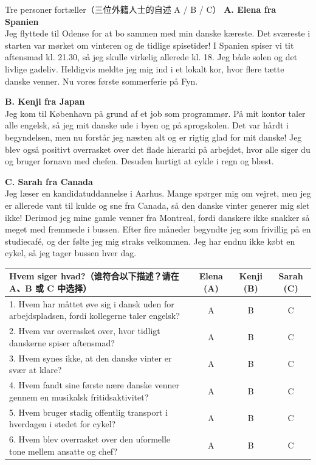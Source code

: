 \vspace{0.3em}
\begin{emailbox}{Tre personer fortæller（三位外籍人士的自述 A / B / C）}
\textbf{A. Elena fra Spanien}\\
Jeg flyttede til Odense for at bo sammen med min danske kæreste. Det sværeste i starten var mørket om vinteren og de tidlige spisetider! I Spanien spiser vi tit aftensmad kl. 21.30, så jeg skulle virkelig  allerede kl. 18. Jeg  både solen og det livlige gadeliv. Heldigvis meldte jeg mig ind i et lokalt kor, hvor  flere tætte danske venner. Nu  vores første sommerferie på Fyn.

\vspace{0.35em}
\textbf{B. Kenji fra Japan}\\
Jeg kom til København på grund af et job som programmør. På mit kontor taler alle engelsk, så jeg  mit danske ude i byen og på sprogskolen. Det var hårdt i begyndelsen, men nu forstår jeg næsten alt og er rigtig glad for mit danske! Jeg blev også positivt overrasket over det flade hierarki på arbejdet, hvor alle siger du og bruger fornavn med chefen. Desuden  hurtigt  at cykle i regn og blæst.

\vspace{0.35em}
\textbf{C. Sarah fra Canada}\\
Jeg læser en kandidatuddannelse i Aarhus. Mange spørger mig om vejret, men jeg er allerede vant til kulde og sne fra Canada, så den danske vinter generer mig slet ikke! Derimod  jeg mine gamle venner fra Montreal, fordi danskere ikke snakker så meget med fremmede i bussen. Efter fire måneder begyndte jeg som frivillig på en studiecafé, og der følte jeg mig straks velkommen. Jeg har endnu ikke købt en cykel, så jeg tager bussen hver dag.
\end{emailbox}

\vspace{0.35em}
{\small
\renewcommand{\arraystretch}{1.28}
\begin{tabularx}{\linewidth}{@{} X c c c @{}}
\toprule
\textbf{Hvem siger hvad?（谁符合以下描述？请在 A、B 或 C 中选择）} & \textbf{Elena (A)} & \textbf{Kenji (B)} & \textbf{Sarah (C)} \\
\midrule
1. Hvem har måttet øve sig i dansk uden for arbejdspladsen, fordi kollegerne taler engelsk? & A & B & C \\
2. Hvem var overrasket over, hvor tidligt danskerne spiser aftensmad? & A & B & C \\
3. Hvem synes ikke, at den danske vinter er svær at klare? & A & B & C \\
4. Hvem fandt sine første nære danske venner gennem en musikalsk fritidsaktivitet? & A & B & C \\
5. Hvem bruger stadig offentlig transport i hverdagen i stedet for cykel? & A & B & C \\
6. Hvem blev overrasket over den uformelle tone mellem ansatte og chef? & A & B & C \\
\bottomrule
\end{tabularx}
}

